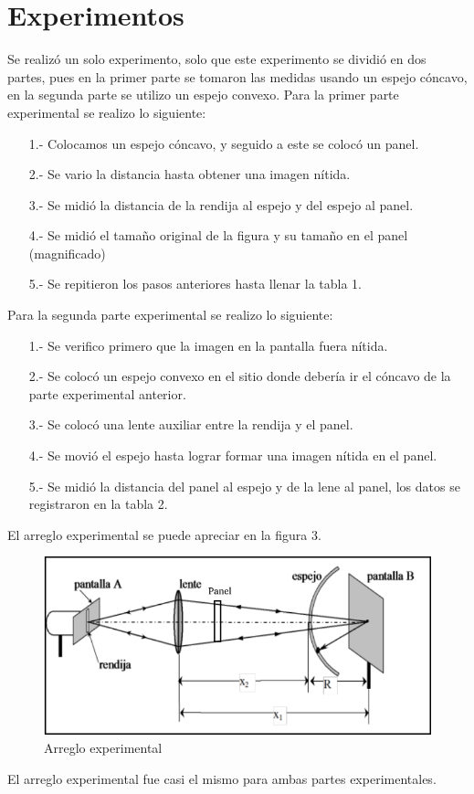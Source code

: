 \documentclass[13,twocolumn,letterpaper]{article}
\begin{document}
\section*{Experimentos}
{
	Se realizó un solo experimento, solo que este experimento se dividió en dos partes, pues en la  primer parte se tomaron las medidas usando un espejo cóncavo, en la segunda parte se utilizo un espejo convexo.
	Para la primer parte experimental se realizo lo siguiente:
	\begin{itemize}
		\item [ 1.- ] Colocamos un espejo cóncavo, y seguido a este se colocó un panel. 
		\item [ 2.- ] Se vario la distancia hasta obtener una imagen nítida.
		\item [ 3.- ] Se midió la distancia de la rendija al espejo y del espejo al panel.
		\item [ 4.- ] Se midió el tamaño original de la figura y su tamaño en el panel (magnificado)
		\item [ 5.- ] Se repitieron los pasos anteriores hasta llenar la tabla 1.
	\end{itemize}
	Para la segunda parte experimental se realizo lo siguiente:
	\begin{itemize}
		\item [ 1.- ]	Se verifico primero que la imagen en la pantalla fuera nítida.
		\item [ 2.- ]	Se colocó un espejo convexo en el sitio donde debería ir el cóncavo de la parte experimental anterior.
		\item [ 3.- ]	Se colocó una lente auxiliar entre la rendija y el panel.
		\item [ 4.- ]	Se movió el espejo hasta lograr formar una imagen nítida en el panel.
		\item [ 5.- ]	Se midió la distancia del panel al espejo y de la lene al panel, los datos se registraron en la tabla 2.
	\end{itemize}
El arreglo experimental se puede apreciar en la figura 3. 
\begin{figure}[h!]
	\raggedleft
	\includegraphics[width=0.9\linewidth]{fig3}
	\caption{Arreglo experimental}
	\label{fig:fig3}
\end{figure}
El arreglo experimental fue casi el mismo para ambas partes experimentales.
}
\end{document}

